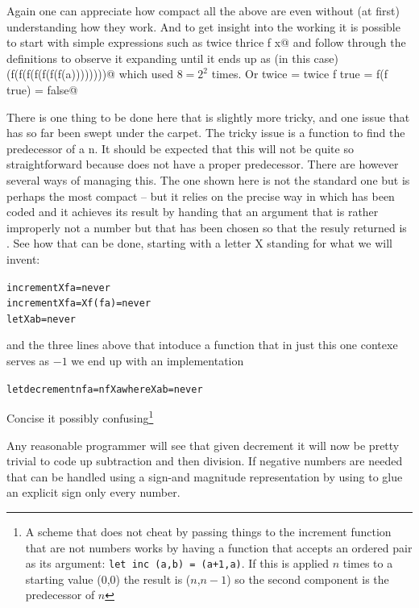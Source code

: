 Again one can appreciate how compact all the above are even without (at first)
understanding how they work. And to get insight into the working it is
possible to start with simple expressions such as \verb@power twice thrice f x@
and follow through the definitions to observe it expanding until it ends up
as (in this case) \verb@f(f(f(f(f(f(f(f(a))))))))@ which used \verb@f@
$8 = 2^{2}$ times. Or \verb@iszero twice = twice f true = f(f true) = false@

There is one thing to be done here that is slightly more tricky, and one
issue that has so far been swept under the carpet. The tricky issue is
a function \verb@decrement@ to find the predecessor of a n. It should be
expected that this will not be quite so straightforward because \verb@never@
does not have a proper predecessor. There are however several ways of
managing this. The one shown here is not the standard one but is perhaps the
most compact -- but it relies on the precise way in which \verb@increment@
has been coded and it achieves its result by handing that an argument that
is rather improperly not a number but that has been chosen so that the
resuly returned is \verb@never@. See how that can be done, starting with
a letter X standing for what we will invent:
\begin{alltt}
  increment X f a = never
  increment X f a = X f (f a) = never
  let X a b = never
\end{alltt}
and the three lines above that intoduce a function \verb@X@ that
in just this one contexe serves as $-1$ we end up with an implementation
\begin{alltt}
  let decrement n f a = n f X a where X a b = never 
\end{alltt}
Concise it possibly confusing\footnote{
A scheme that does not cheat by passing things to the increment function that
are not numbers works by having a function that accepts an ordered pair as
its argument: \texttt{let inc (a,b) = (a+1,a)}. If this is applied $n$ times
to a starting value (0,0) the result is ($n$,$n-1$) so the second component is
the predecessor of $n$}

Any reasonable programmer will see that given decrement it will now be
pretty trivial to code up subtraction and then division. If negative numbers
are needed that can be handled using a sign-and magnitude representation
by using \verb@pair@ to glue an explicit sign only every number.

